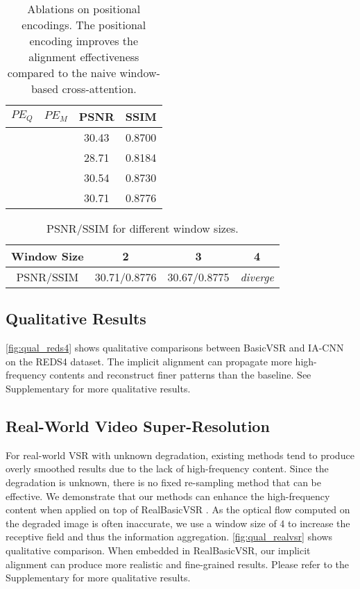 \documentclass[10pt,twocolumn,letterpaper]{article}
\newcommand{\cmark}{\ding{51}}\newcommand{\xmark}{\ding{55}}
\begin{document}
\begin{table}[h]
\centering
\small
\begin{tabular}{c|c|c|c}
\toprule
$PE_Q$      & $PE_M$    & PSNR & SSIM   \\
\midrule
\xmark      & \xmark    & 30.43 & 0.8700   \\
\cmark      & \xmark    & 28.71 & 0.8184   \\
\xmark      & \cmark    & 30.54 & 0.8730   \\
\cmark      & \cmark    & 30.71 & 0.8776   \\
\bottomrule
\end{tabular}
\caption{Ablations on positional encodings. The positional encoding improves the alignment effectiveness compared to the naive window-based cross-attention.}\label{tab:pe}
\end{table}

\begin{table}[h]
\centering
\small
\begin{tabular}{c|c|c|c}
\toprule
Window Size & 2 &3 &4   \\
\midrule
PSNR/SSIM           & 30.71/0.8776  &30.67/0.8775   &  \textit{diverge}      \\
\bottomrule
\end{tabular}
\caption{PSNR/SSIM for different window sizes.}\label{tab:window_size}
\vspace{-.5cm}

\end{table}

\subsection{Qualitative Results}
\cref{fig:qual_reds4} shows qualitative comparisons between BasicVSR and IA-CNN on the REDS4 dataset. The implicit alignment can propagate more high-frequency contents and reconstruct finer patterns than the baseline. See Supplementary for more qualitative results.
\subsection{Real-World Video Super-Resolution}

For real-world VSR with unknown degradation, existing methods tend to produce overly smoothed results due to the lack of high-frequency content. Since the degradation is unknown, there is no fixed re-sampling method that can be effective. We demonstrate that our methods can enhance the high-frequency content when applied on top of RealBasicVSR \cite{chan2022investigating}. As the optical flow computed on the degraded image is often inaccurate, we use a window size of 4 to increase the receptive field and thus the information aggregation. \cref{fig:qual_realvsr} shows qualitative comparison. When embedded in RealBasicVSR, our implicit alignment can produce more realistic and fine-grained results. Please refer to the Supplementary for more qualitative results.
\end{document}
